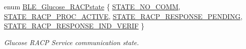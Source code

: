 \begin{DoxyCompactItemize}
enum \hyperlink{group___b_l_e___g_s_ga2377e8b14a4dbee0ccc46ebf3970633c}{B\+L\+E\+\_\+\+Glucose\+\_\+\+R\+A\+C\+Pstate} \{ \hyperlink{group___b_l_e___g_s_gga2377e8b14a4dbee0ccc46ebf3970633cab892dc8bda08cca695cec9d2525c886a}{S\+T\+A\+T\+E\+\_\+\+N\+O\+\_\+\+C\+O\+MM}, 
\hyperlink{group___b_l_e___g_s_gga2377e8b14a4dbee0ccc46ebf3970633ca19d4e79a1a06d26731a150539ccf8f4c}{S\+T\+A\+T\+E\+\_\+\+R\+A\+C\+P\+\_\+\+P\+R\+O\+C\+\_\+\+A\+C\+T\+I\+VE}, 
\hyperlink{group___b_l_e___g_s_gga2377e8b14a4dbee0ccc46ebf3970633ca552ae1c7135d17b86e9061d7b41a0e2f}{S\+T\+A\+T\+E\+\_\+\+R\+A\+C\+P\+\_\+\+R\+E\+S\+P\+O\+N\+S\+E\+\_\+\+P\+E\+N\+D\+I\+NG}, 
\hyperlink{group___b_l_e___g_s_gga2377e8b14a4dbee0ccc46ebf3970633cac9e1172d0c84f0307bcbe3a26df9d92d}{S\+T\+A\+T\+E\+\_\+\+R\+A\+C\+P\+\_\+\+R\+E\+S\+P\+O\+N\+S\+E\+\_\+\+I\+N\+D\+\_\+\+V\+E\+R\+IF}
 \}\begin{DoxyCompactList}\small\item\em Glucose R\+A\+CP Service communication state. \end{DoxyCompactList}
\end{DoxyCompactItemize}
